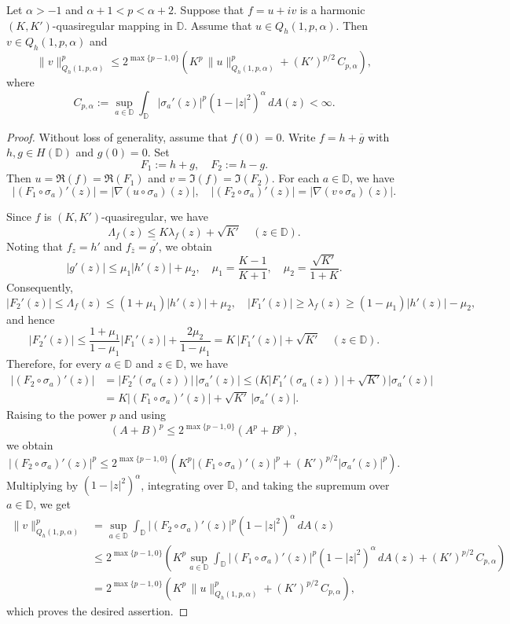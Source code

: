 \documentclass[12pt, reqno]{amsart}
\begin{document}
\begin{theorem}\label{thm:Qh-CK21}
Let $\alpha>-1$ and $\alpha+1<p<\alpha+2$. Suppose that $f=u+iv$ is a harmonic $(K,K')$-quasiregular mapping in $\mathbb D$. Assume that $u\in Q_h(1,p,\alpha)$. Then $v\in Q_h(1,p,\alpha)$ and
\[
\|v\|_{Q_h(1,p,\alpha)}^{p}\le 2^{\max\{p-1,0\}}
\left(K^{p}\,\|u\|_{Q_h(1,p,\alpha)}^{p}+(K')^{p/2}\,C_{p,\alpha}\right),
\]
where
\[
C_{p,\alpha}:=\sup_{a\in\mathbb D}\int_{\mathbb D}|\sigma_a'(z)|^{p}(1-|z|^{2})^{\alpha}\,dA(z)<\infty.
\]
\end{theorem}

\begin{proof}
Without loss of generality, assume that $f(0)=0$. Write $f=h+\overline g$ with $h,g\in H(\mathbb D)$ and $g(0)=0$. Set
\[
F_1:=h+g,\quad F_2:=h-g.
\]
Then $u=\Re(f)=\Re(F_1)$ and $v=\Im(f)=\Im(F_2)$. For each $a\in\mathbb D$, we have
\[
|(F_1\circ\sigma_a)'(z)|=|\nabla(u\circ\sigma_a)(z)|,\quad |(F_2\circ\sigma_a)'(z)|=|\nabla(v\circ\sigma_a)(z)|.
\]

Since $f$ is $(K,K')$-quasiregular, we have
\[
\Lambda_f(z)\le K\lambda_f(z)+\sqrt{K'}\quad (z\in\mathbb D).
\]
Noting that $f_z=h'$ and $f_{\bar z}=\overline{g'}$, we obtain
\[
|g'(z)|\le \mu_1 |h'(z)|+\mu_2,\quad 
\mu_1=\frac{K-1}{K+1},\quad \mu_2=\frac{\sqrt{K'}}{1+K}.
\]
Consequently,
\[
|F_2'(z)|\le \Lambda_f(z)\le (1+\mu_1)|h'(z)|+\mu_2,
\quad
|F_1'(z)|\ge \lambda_f(z)\ge (1-\mu_1)|h'(z)|-\mu_2,
\]
and hence
\[
|F_2'(z)|\le \frac{1+\mu_1}{1-\mu_1}|F_1'(z)|+\frac{2\mu_2}{1-\mu_1}
=K\,|F_1'(z)|+\sqrt{K'}\quad (z\in\mathbb D).
\]
Therefore, for every $a\in\mathbb D$ and $z\in\mathbb D$, we have
\begin{align*}
|(F_2\circ\sigma_a)'(z)|
&=|F_2'(\sigma_a(z))|\,|\sigma_a'(z)|
\le \bigl(K|F_1'(\sigma_a(z))|+\sqrt{K'}\bigr)\,|\sigma_a'(z)|  \\
&=K|(F_1\circ\sigma_a)'(z)|+\sqrt{K'}\,|\sigma_a'(z)|.
\end{align*}
Raising to the power $p$ and using $$(A+B)^p\le 2^{\max\{p-1,0\}}(A^p+B^p),$$ we obtain
\[
|(F_2\circ\sigma_a)'(z)|^{p}
\le 2^{\max\{p-1,0\}}
\left(
K^{p}|(F_1\circ\sigma_a)'(z)|^{p}
+(K')^{p/2}|\sigma_a'(z)|^{p}
\right).
\]
Multiplying by $(1-|z|^{2})^{\alpha}$, integrating over $\mathbb D$, and taking the supremum over $a\in\mathbb D$, we get
\begin{align*}
\|v\|_{Q_h(1,p,\alpha)}^{p}
&=\sup_{a\in\mathbb D}\int_{\mathbb D}|(F_2\circ\sigma_a)'(z)|^{p}(1-|z|^{2})^{\alpha}\,dA(z)\\
&\le 2^{\max\{p-1,0\}}
\left(
K^{p}\sup_{a\in\mathbb D}\int_{\mathbb D}|(F_1\circ\sigma_a)'(z)|^{p}(1-|z|^{2})^{\alpha}\,dA(z)
+(K')^{p/2}\,C_{p,\alpha}
\right)\\
&=2^{\max\{p-1,0\}}
\left(
K^{p}\,\|u\|_{Q_h(1,p,\alpha)}^{p}+(K')^{p/2}\,C_{p,\alpha}
\right),
\end{align*}
which proves the desired assertion.
\end{proof}
\end{document}
